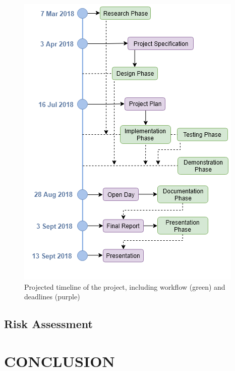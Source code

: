 \documentclass[10pt,twocolumn]{witseiepaper}
\begin{document}
	\begin{figure}
		\centering
		\includegraphics[width=1\columnwidth]{media/timeline.png}
		\caption{Projected timeline of the project, including workflow (green) and deadlines (purple)}
		\raggedright
		\label{fig:timeline}
	\end{figure}
	
	
	\subsection{Risk Assessment}

\section{CONCLUSION}

{}

\end{document}
